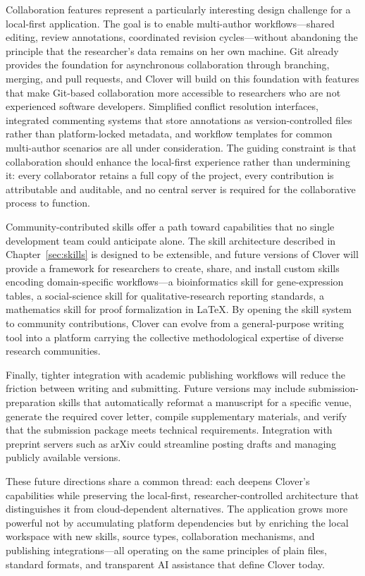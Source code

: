 \documentclass[a4paper,11pt]{article}
\begin{document}
Collaboration features represent a particularly interesting design challenge for a local-first application. The goal is to enable multi-author workflows---shared editing, review annotations, coordinated revision cycles---without abandoning the principle that the researcher's data remains on her own machine. Git already provides the foundation for asynchronous collaboration through branching, merging, and pull requests, and Clover will build on this foundation with features that make Git-based collaboration more accessible to researchers who are not experienced software developers. Simplified conflict resolution interfaces, integrated commenting systems that store annotations as version-controlled files rather than platform-locked metadata, and workflow templates for common multi-author scenarios are all under consideration. The guiding constraint is that collaboration should enhance the local-first experience rather than undermining it: every collaborator retains a full copy of the project, every contribution is attributable and auditable, and no central server is required for the collaborative process to function.

Community-contributed skills offer a path toward capabilities that no single development team could anticipate alone. The skill architecture described in Chapter~\ref{sec:skills} is designed to be extensible, and future versions of Clover will provide a framework for researchers to create, share, and install custom skills encoding domain-specific workflows---a bioinformatics skill for gene-expression tables, a social-science skill for qualitative-research reporting standards, a mathematics skill for proof formalization in \LaTeX{}. By opening the skill system to community contributions, Clover can evolve from a general-purpose writing tool into a platform carrying the collective methodological expertise of diverse research communities.

Finally, tighter integration with academic publishing workflows will reduce the friction between writing and submitting. Future versions may include submission-preparation skills that automatically reformat a manuscript for a specific venue, generate the required cover letter, compile supplementary materials, and verify that the submission package meets technical requirements. Integration with preprint servers such as arXiv could streamline posting drafts and managing publicly available versions.

These future directions share a common thread: each deepens Clover's capabilities while preserving the local-first, researcher-controlled architecture that distinguishes it from cloud-dependent alternatives. The application grows more powerful not by accumulating platform dependencies but by enriching the local workspace with new skills, source types, collaboration mechanisms, and publishing integrations---all operating on the same principles of plain files, standard formats, and transparent AI assistance that define Clover today.
\end{document}
